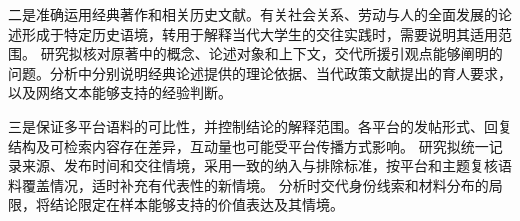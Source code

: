 二是准确运用经典著作和相关历史文献。有关社会关系、劳动与人的全面发展的论述形成于特定历史语境，转用于解释当代大学生的交往实践时，需要说明其适用范围。
研究拟核对原著中的概念、论述对象和上下文，交代所援引观点能够阐明的问题。分析中分别说明经典论述提供的理论依据、当代政策文献提出的育人要求，以及网络文本能够支持的经验判断。

三是保证多平台语料的可比性，并控制结论的解释范围。各平台的发帖形式、回复结构及可检索内容存在差异，互动量也可能受平台传播方式影响。
研究拟统一记录来源、发布时间和交往情境，采用一致的纳入与排除标准，按平台和主题复核语料覆盖情况，适时补充有代表性的新情境。
分析时交代身份线索和材料分布的局限，将结论限定在样本能够支持的价值表达及其情境。
